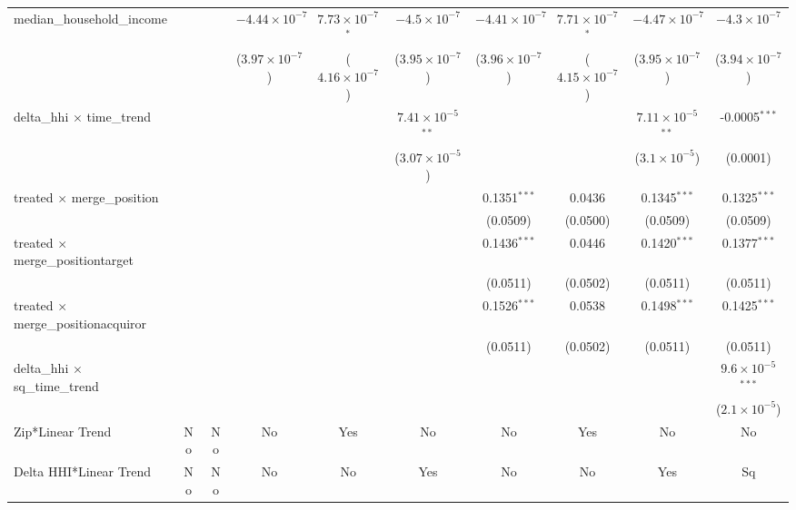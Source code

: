 \begin{table}[H]
{\begin{tabular}{lccccccccc}
 median\_household\_income&   &    & $-4.44\times 10^{-7}$ & $7.73\times 10^{-7}$$^{*}$ & $-4.5\times 10^{-7}$ & $-4.41\times 10^{-7}$ & $7.71\times 10^{-7}$$^{*}$ & $-4.47\times 10^{-7}$ & $-4.3\times 10^{-7}$\\ 

   &   &    & ($3.97\times 10^{-7}$) & ($4.16\times 10^{-7}$) & ($3.95\times 10^{-7}$) & ($3.96\times 10^{-7}$) & ($4.15\times 10^{-7}$) & ($3.95\times 10^{-7}$) & ($3.94\times 10^{-7}$)\\ 

 delta\_hhi $\times $ time\_trend&   &    &    &    & $7.41\times 10^{-5}$$^{**}$ &    &    & $7.11\times 10^{-5}$$^{**}$ & -0.0005$^{***}$\\ 

   &   &    &    &    & ($3.07\times 10^{-5}$) &    &    & ($3.1\times 10^{-5}$) & (0.0001)\\ 

 treated $\times $ merge\_position&   &    &    &    &    & 0.1351$^{***}$ & 0.0436 & 0.1345$^{***}$ & 0.1325$^{***}$\\ 

   &   &    &    &    &    & (0.0509) & (0.0500) & (0.0509) & (0.0509)\\ 

 treated $\times $ merge\_positiontarget&   &    &    &    &    & 0.1436$^{***}$ & 0.0446 & 0.1420$^{***}$ & 0.1377$^{***}$\\ 

   &   &    &    &    &    & (0.0511) & (0.0502) & (0.0511) & (0.0511)\\ 

 treated $\times $ merge\_positionacquiror&   &    &    &    &    & 0.1526$^{***}$ & 0.0538 & 0.1498$^{***}$ & 0.1425$^{***}$\\ 

   &   &    &    &    &    & (0.0511) & (0.0502) & (0.0511) & (0.0511)\\ 

 delta\_hhi $\times $ sq\_time\_trend&   &    &    &    &    &    &    &    & $9.6\times 10^{-5}$$^{***}$\\ 

   &   &    &    &    &    &    &    &    & ($2.1\times 10^{-5}$)\\ 

 Zip*Linear Trend & No & No & No & Yes & No & No & Yes & No & No\\ 

 Delta HHI*Linear Trend & No & No & No & No & Yes & No & No & Yes & Sq\\ 


\end{tabular}}
\end{table}
